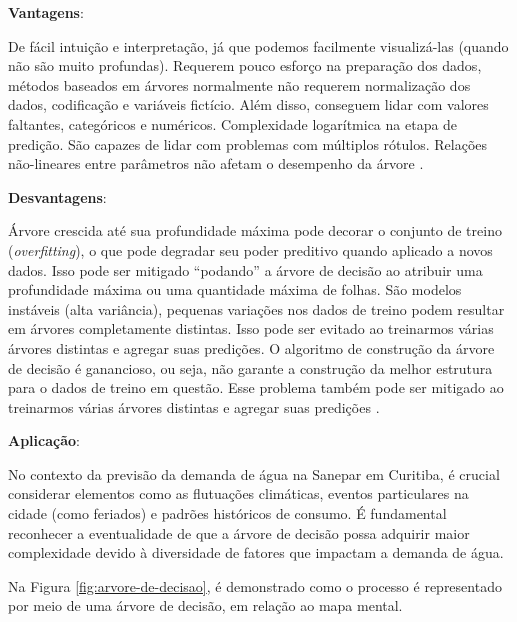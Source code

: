 \noindent\textbf{Vantagens}:


De fácil intuição e interpretação, já que podemos facilmente visualizá-las (quando não são muito profundas).
Requerem pouco esforço na preparação dos dados, métodos baseados em árvores normalmente não requerem normalização dos dados, codificação e variáveis fictício. Além disso, conseguem lidar com valores faltantes, categóricos e numéricos.
Complexidade logarítmica na etapa de predição.
São capazes de lidar com problemas com múltiplos rótulos.
Relações não-lineares entre parâmetros não afetam o desempenho da árvore \cite{remigio2023arvores}.


\noindent\textbf{Desvantagens}:

Árvore crescida até sua profundidade máxima pode decorar o conjunto de treino (\textit{overfitting}), o que pode degradar seu poder preditivo quando aplicado a novos dados. Isso pode ser mitigado “podando” a árvore de decisão ao atribuir uma profundidade máxima ou uma quantidade máxima de folhas.
São modelos instáveis (alta variância), pequenas variações nos dados de treino podem resultar em árvores completamente distintas. Isso pode ser evitado ao treinarmos várias árvores distintas e agregar suas predições.
O algoritmo de construção da árvore de decisão é ganancioso, ou seja, não garante a construção da melhor estrutura para o dados de treino em questão. Esse problema também pode ser mitigado ao treinarmos várias árvores distintas e agregar suas predições \cite{remigio2023arvores}.


\textbf{Aplicação}:

No contexto da previsão da demanda de água na Sanepar em Curitiba, é crucial considerar elementos como as flutuações climáticas, eventos particulares na cidade (como feriados) e padrões históricos de consumo. É fundamental reconhecer a eventualidade de que a árvore de decisão possa adquirir maior complexidade devido à diversidade de fatores que impactam a demanda de água.

Na Figura \ref{fig:arvore-de-decisao}, é demonstrado como o processo é representado por meio de uma árvore de decisão, em relação ao mapa mental.

